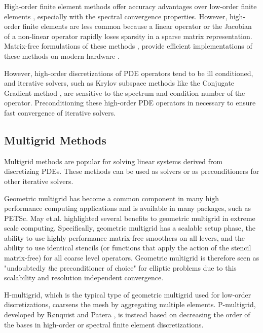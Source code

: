 High-order finite element methods offer accuracy advantages over low-order finite elements \cite{demkowicz1989toward, oden1989toward, rachowicz1989toward}, especially with the spectral convergence properties.
However, high-order finite elements are less common because a linear operator or the Jacobian of a non-linear operator rapidly loses sparsity in a sparse matrix representation.
Matrix-free formulations of these methods \cite{brown2010efficient, deville2002highorder, knoll2004jacobian}, provide efficient implementations of these methods on modern hardware \cite{libceed-user-manual, fischer2020scalability, kronbichler2019multigrid}.

However, high-order discretizations of PDE operators tend to be ill conditioned, and iterative solvers, such as Krylov subspace methods like the Conjugate Gradient method \cite{hestenes1952methods, shewchuk1994introduction}, are sensitive to the spectrum and condition number of the operator.
Preconditioning these high-order PDE operators in necessary to ensure fast convergence of iterative solvers.

\subsection{Multigrid Methods}

Multigrid methods \cite{brandt1982guide, briggs2000multigrid, stuben1982multigrid} are popular for solving linear systems derived from discretizing PDEs.
These methods can be used as solvers or as preconditioners for other iterative solvers.

Geometric multigrid has become a common component in many high performance computing applications and is available in many packages, such as PETSc.
May et.al. \cite{may2016extreme} highlighted several benefits to geometric multigrid in extreme scale computing.
Specifically, geometric multigrid has a scalable setup phase, the ability to use highly performance matrix-free smoothers on all levers, and the ability to use identical stencils (or functions that apply the action of the stencil matrix-free) for all coarse level operators.
Geometric multigrid is therefore seen as "undoubtedly {\textit the preconditioner of choice}" for elliptic problems due to this scalability and resolution independent convergence.

H-multigrid, which is the typical type of geometric multigrid used for low-order discretizations, coarsens the mesh by aggregating multiple elements.
P-multigrid, developed by R{\o}nquist and Patera \cite{ronquist1987spectral}, is instead based on decreasing the order of the bases in high-order or spectral finite element discretizations.

